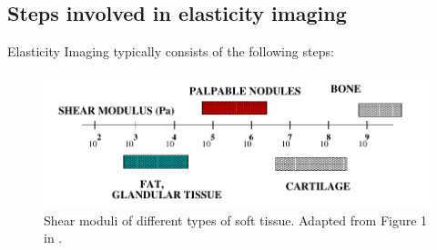 \documentclass[12pt]{article}
\begin{document}
\subsection{Steps involved in elasticity imaging}
Elasticity Imaging typically consists of  the following steps:
%
\begin{figure}
   \centering
    \includegraphics[totalheight=3cm]{Figures/shearmod.png}
  \caption{\label{fig:shearmod} Shear moduli of different types of soft tissue. Adapted from Figure 1 in \cite{paper:sarv1998}.}
\end{figure}
%
\end{document}

